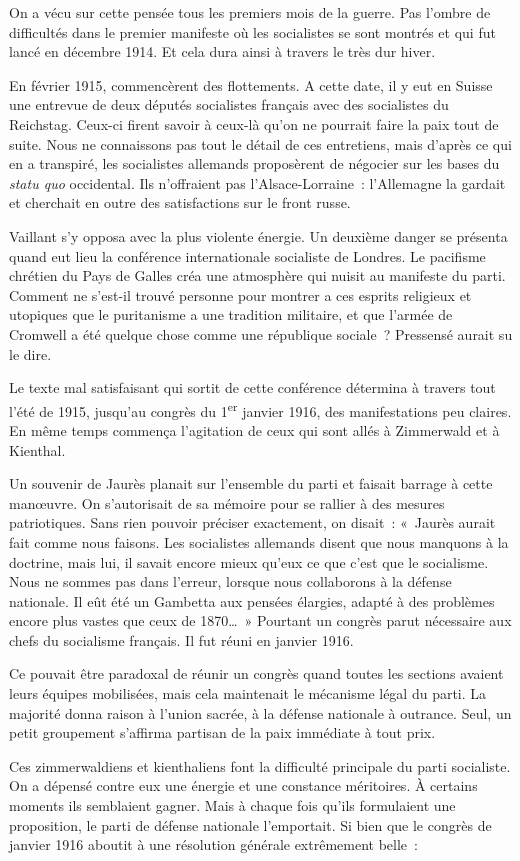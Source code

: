 \documentclass[french,twoside]{book} %
\begin{document}
On a vécu sur cette pensée tous les premiers mois de la guerre. Pas l’ombre de difficultés dans le premier manifeste où les socialistes se sont montrés et qui fut lancé en décembre 1914. Et cela dura ainsi à travers le très dur hiver.‌\par
En février 1915, commencèrent des flottements. A cette date, il y eut en Suisse une entrevue de deux députés socialistes français avec des socialistes du Reichstag. Ceux-ci firent savoir à ceux-là qu’on ne pourrait faire la paix tout de suite. Nous ne connaissons pas tout le détail de ces entretiens, mais d’après ce qui en a transpiré, les socialistes allemands proposèrent de négocier sur les bases du {\itshape statu quo} occidental. Ils n’offraient pas l’Alsace-Lorraine : l’Allemagne la gardait et cherchait en outre des satisfactions sur le front russe.‌\par
Vaillant s’y opposa avec la plus violente énergie. Un deuxième danger se présenta quand eut lieu la conférence internationale socialiste de Londres. Le pacifisme chrétien du Pays de Galles créa une atmosphère qui nuisit au manifeste du parti. Comment ne s’est-il trouvé personne pour montrer a ces esprits religieux et utopiques que le puritanisme a une tradition militaire, et que l’armée de Cromwell a été quelque chose comme une république sociale ? Pressensé aurait su le dire.‌\par
Le texte mal satisfaisant qui sortit de cette conférence détermina à travers tout l’été de 1915, jusqu’au congrès du 1\textsuperscript{er} janvier 1916, des manifestations peu claires. En même temps commença l’agitation de ceux qui sont allés à Zimmerwald et à Kienthal.‌\par
Un souvenir de Jaurès planait sur l’ensemble du parti et faisait barrage à cette manœuvre. On s’autorisait de sa mémoire pour se rallier à des mesures patriotiques. Sans rien pouvoir préciser exactement, on disait : « Jaurès aurait fait comme nous faisons. Les socialistes allemands disent que nous manquons à la doctrine, mais lui, il savait encore mieux qu’eux ce que c’est que le socialisme. Nous ne sommes pas dans l’erreur, lorsque nous collaborons à la défense nationale. Il eût été un Gambetta aux pensées élargies, adapté à des problèmes encore plus vastes que ceux de 1870… » Pourtant un congrès parut nécessaire aux chefs du socialisme français. Il fut réuni en janvier 1916.‌\par
Ce pouvait être paradoxal de réunir un congrès quand toutes les sections avaient leurs équipes mobilisées, mais cela maintenait le mécanisme légal du parti. La majorité donna raison à l’union sacrée, à la défense nationale à outrance. Seul, un petit groupement s’affirma partisan de la paix immédiate à tout prix.‌\par
Ces zimmerwaldiens et kienthaliens font la difficulté principale du parti socialiste. On a dépensé contre eux une énergie et une constance méritoires. À certains moments ils semblaient gagner. Mais à chaque fois qu’ils formulaient une proposition, le parti de défense nationale l’emportait. Si bien que le congrès de janvier 1916 aboutit à une résolution générale extrêmement belle :‌\par
\end{document}
